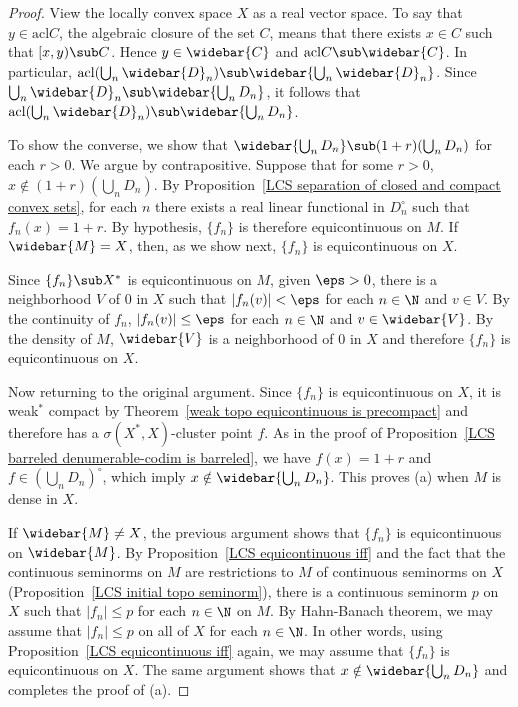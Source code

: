 \begin{proof}
View the locally convex space $X$ as a real vector space. To say that $y\in\mathrm{acl}C$, the algebraic closure of the set $C$, means that there exists $x\in C$ such that $[x,y)\sub C$. Hence $y\in\widebar{C}$ and $\mathrm{acl}C\sub\widebar{C}$. In particular, $\mathrm{acl}(\bigcup_n\widebar{D}_n)\sub\widebar{\bigcup_n\widebar{D}_n}$. Since $\bigcup_n\widebar{D}_n\sub\widebar{\bigcup_nD_n}$, it follows that $\mathrm{acl}(\bigcup_n\widebar{D}_n)\sub\widebar{\bigcup_nD_n}$.\par
To show the converse, we show that $\widebar{\bigcup_nD_n}\sub(1+r)(\bigcup_nD_n)$ for each $r>0$. We argue by contrapositive. Suppose that for some $r>0$, $x\notin(1+r)(\bigcup_nD_n)$. By Proposition~\ref{LCS separation of closed and compact convex sets}, for each $n$ there exists a real linear functional in $D_n^\circ$ such that $f_n(x)=1+r$. By hypothesis, $\{f_n\}$ is therefore equicontinuous on $M$. If $\widebar{M}=X$, then, as we show next, $\{f_n\}$ is equicontinuous on $X$.\par
Since $\{f_n\}\sub X^*$ is equicontinuous on $M$, given $\eps>0$, there is a neighborhood $V$ of $0$ in $X$ such that $|f_n(v)|<\eps$ for each $n\in\N$ and $v\in V$. By the continuity of $f_n$, $|f_n(v)|\leq\eps$ for each $n\in\N$ and $v\in\widebar{V}$. By the density of $M$, $\widebar{V}$ is a neighborhood of $0$ in $X$ and therefore $\{f_n\}$ is equicontinuous on $X$.\par
Now returning to the original argument. Since $\{f_n\}$ is equicontinuous on $X$, it is weak$^*$ compact by Theorem~\ref{weak topo equicontinuous is precompact} and therefore has a $\sigma(X^*,X)$-cluster point $f$. As in the proof of Proposition~\ref{LCS barreled denumerable-codim is barreled}, we have $f(x)=1+r$ and $f\in(\bigcup_nD_n)^\circ$, which imply $x\notin\widebar{\bigcup_nD_n}$. This proves (a) when $M$ is dense in $X$.\par
If $\widebar{M}\neq X$, the previous argument shows that $\{f_n\}$ is equicontinuous on $\widebar{M}$. By Proposition~\ref{LCS equicontinuous iff} and the fact that the continuous seminorms on $M$ are restrictions to $M$ of continuous seminorms on $X$ (Proposition~\ref{LCS initial topo seminorm}), there is a continuous seminorm $p$ on $X$ such that $|f_n|\leq p$ for each $n\in\N$ on $M$. By Hahn-Banach theorem, we may assume that $|f_n|\leq p$ on all of $X$ for each $n\in\N$. In other words, using Proposition~\ref{LCS equicontinuous iff} again, we may assume that $\{f_n\}$ is equicontinuous on $X$. The same argument shows that $x\notin\widebar{\bigcup_nD_n}$ and completes the proof of (a).\par

\end{proof}
